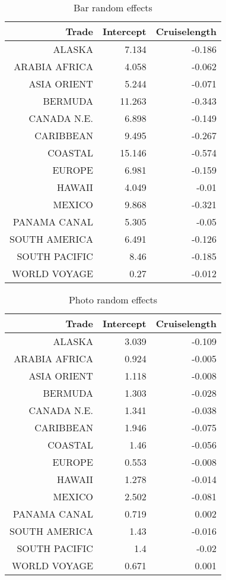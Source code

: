 \documentclass{article}
\begin{document}
	\begin{table}[H]\centering 
	\begin{tabular}{rrr}
	Trade & Intercept  & Cruiselength \\ 
	\hline 
	\hline 
	ALASKA & 7.134 & -0.186 \\
	ARABIA AFRICA & 4.058 & -0.062 \\
	ASIA ORIENT & 5.244 & -0.071 \\
	BERMUDA & 11.263 & -0.343 \\
	CANADA N.E. & 6.898 & -0.149 \\
	CARIBBEAN & 9.495 & -0.267 \\
	COASTAL & 15.146 & -0.574 \\
	EUROPE & 6.981 & -0.159 \\
	HAWAII & 4.049 & -0.01 \\
	MEXICO & 9.868 & -0.321 \\
	PANAMA CANAL & 5.305 & -0.05 \\
	SOUTH AMERICA & 6.491 & -0.126 \\
	SOUTH PACIFIC & 8.46 & -0.185 \\
	WORLD VOYAGE & 0.27 & -0.012 \\
	\hline 
	\hline 
	\end{tabular}
	\caption{Bar random effects}
	\end{table}
	
	\begin{table}[H]\centering
		\begin{tabular}{rrr}
			Trade & Intercept & Cruiselength \\
			\hline 
			\hline 
			ALASKA & 3.039 & -0.109 \\
			ARABIA AFRICA & 0.924 & -0.005 \\
			ASIA ORIENT & 1.118 & -0.008 \\
			BERMUDA & 1.303 & -0.028 \\
			CANADA N.E. & 1.341 & -0.038 \\
			CARIBBEAN & 1.946 & -0.075 \\
			COASTAL & 1.46 & -0.056 \\
			EUROPE & 0.553 & -0.008 \\
			HAWAII & 1.278 & -0.014 \\
			MEXICO & 2.502 & -0.081 \\
			PANAMA CANAL & 0.719 & 0.002 \\
			SOUTH AMERICA & 1.43 & -0.016 \\
			SOUTH PACIFIC & 1.4 & -0.02 \\
			WORLD VOYAGE & 0.671 & 0.001 \\
			\hline 
			\hline 
		\end{tabular}
		\caption{Photo random effects}
	\end{table}
	
\end{document}

